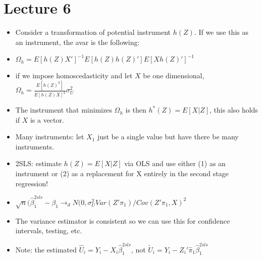 \documentclass[11pt]{article} %
\begin{document}
\section{Lecture 6}
\begin{itemize}
\item Consider a transformation of potential instrument $h(Z)$. If we use this as an instrument, the avar is the following:
\item $\Omega_h = E[h(Z)X']^{-1}E[h(Z)h(Z)']E[Xh(Z)']^{-1}$
\item if we impose homoscedasticity and let $X$ be one dimensional, $\Omega_h = \frac{E[h(Z)^2]}{E[h(Z)X]^2}\sigma^2_U$
\item The instrument that minimizes $\Omega_h$ is then $h^*(Z) = E[X|Z]$, this also holds if $X$ is a vector.
\item Many instruments: let $X_1$ just be a single value but have there be many instruments. 
\item 2SLS: estimate $h(Z) = E[X|Z]$ via OLS and use either (1) as an instrument or (2) as a replacement for X entirely in the second stage regression! 
\item $\sqrt{n}(\hat{\beta}_1^{2sls} - \beta_1 \rightarrow_d N(0,\sigma_U^2Var(Z'\pi_1)/Cov(Z'\pi_1,X)^2$ 
\item The variance estimator is consistent so we can use this for confidence intervals, testing, etc.
\item Note: the estimated $\hat{U}_i = Y_i - X_i\hat{\beta}_1^{2sls}$, not $\tilde{U}_i =  Y_i - Z_i'\hat{\pi}_1\hat{\beta}_1^{2sls}$
\end{itemize}
\end{document}

